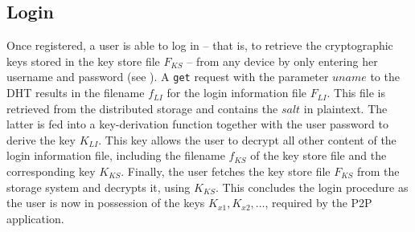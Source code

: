 

\subsection{Login} 

Once registered, a user is able to log in -- that is, to retrieve the
cryptographic keys stored in the key store file $F_{KS}$ -- 
from any device by only entering her username and password (see ).
%
A \texttt{get} request with the parameter $uname$ to the DHT results in the 
filename $f_{LI}$ for the login information file $F_{LI}$. 
This file is retrieved from the distributed storage and contains the $salt$ in plaintext.
The latter is fed into a key-derivation function together with the user password to derive the key $K_{LI}$.
This key allows the user to decrypt all other content of the login information file,
including the filename $f_{KS}$ of the key store file and the corresponding key $K_{KS}$.
Finally, the user fetches the key store file $F_{KS}$ from the storage system 
and decrypts it, using $K_{KS}$. 
This concludes the login procedure as the user is now in possession
of the keys $K_{x1}, K_{x2}, \dots$, required by the P2P application.

